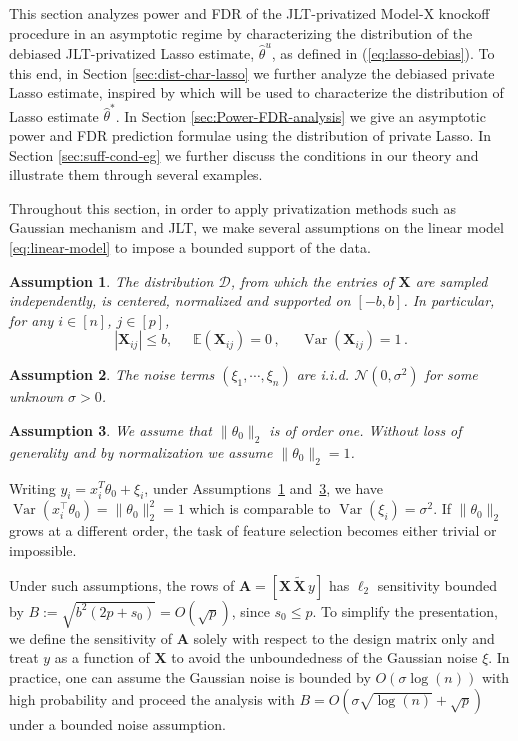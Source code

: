 \documentclass[11pt]{article}
\DeclareMathOperator{\Var}{Var}
\newcommand{\bX}{\boldsymbol{X}}
\newcommand{\bXT}{\widetilde{\bX} }
\newcommand{\bA}{\boldsymbol{A}}
\newcommand{\mcN}{\mathcal{N}}
\newcommand{\Expected}{\mathbb{E}}
\newcommand{\hth}{\widehat{\theta}}
\newtheorem{assumption}{Assumption}
\begin{document}
This section analyzes power and FDR of the JLT-privatized Model-X knockoff procedure in an asymptotic regime by characterizing the distribution of the debiased JLT-privatized Lasso estimate, $\hth^u$, as defined in (\ref{eq:lasso-debias}). To this end, in Section \ref{sec:dist-char-lasso} we further analyze the debiased private Lasso estimate, inspired by \cite{JM14} which will be used to characterize the distribution of Lasso estimate $\hth^*$. In Section \ref{sec:Power-FDR-analysis} we give an asymptotic power and FDR prediction formulae using the distribution of private Lasso. In Section \ref{sec:suff-cond-eg} we further discuss the conditions in our theory and illustrate them through several examples.

Throughout this section, in order to apply privatization methods such as Gaussian mechanism and JLT, we make several assumptions on the linear model \eqref{eq:linear-model} to impose a bounded support of the data.
\begin{assumption}\label{ass1}
    The distribution $\mathcal{D}$, from which the entries of $\bX$ are sampled independently, is centered, normalized and supported on $[-b,b]$. In particular, for any $i\in[n]$, $j\in[p]$, 
    \begin{equation}\label{eq:X-def}
        |\bX_{ij}|\leq b ,\phantom{sss}\Expected(\bX_{ij}) = 0\,, \phantom{sss} \Var(\bX_{ij}) = 1\,.
    \end{equation}
\end{assumption}
\begin{assumption}\label{ass2}
    The noise terms $(\xi_1,\cdots,\xi_n)$ are i.i.d. $\mcN(0,\sigma^2)$ for some unknown $\sigma>0$.
\end{assumption}
\begin{assumption}\label{ass3} We assume that $\|\theta_0\|_2$ is of order one. Without loss of generality and by normalization we assume $\|\theta_0\|_2=1$.
\end{assumption}
Writing $y_i = x_i^{T} \theta_0 + \xi_i$, under Assumptions~\ref{ass1} and~\ref{ass3}, we have $\Var(x_i^\top \theta_0) = \|\theta_0\|_2^2 = 1$ which is comparable to $\Var(\xi_i) = \sigma^2$. If $\|\theta_0\|_2$ grows at a different order, the task of feature selection becomes either trivial or impossible.

Under such assumptions, the rows of $\bA=[\bX\,\bXT\, y]$ has $\ell_2$ sensitivity bounded by $B:= \sqrt{b^2(2p+s_0)}=O(\sqrt{p})$, since $s_0\le p$. To simplify the presentation, we define the sensitivity of $\bA$ solely with respect to the design matrix only and treat $y$ as a function of $\bX$ to avoid the unboundedness of the Gaussian noise $\xi$. In practice, one can assume the Gaussian noise is bounded by $O(\sigma\log(n))$ with high probability and proceed the analysis with $B= O(\sigma\sqrt{\log(n)}+\sqrt{p})$ under a bounded noise assumption.
\end{document}

